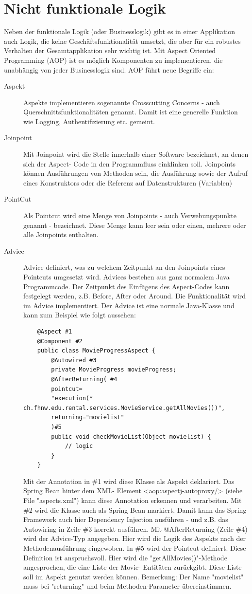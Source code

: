 \documentclass[a4paper,10pt]{scrreprt}
\begin{document}
\section{Nicht funktionale Logik}
Neben der funktionale Logik (oder Businesslogik) gibt es in einer Applikation auch Logik, die keine
Geschäftsfunktionalität umsetzt, die aber für ein robustes Verhalten der Gesamtapplikation sehr
wichtig ist. Mit Aspect Oriented Programming (AOP) ist es möglich Komponenten zu
implementieren, die unabhängig von jeder Businesslogik sind.
AOP führt neue Begriffe ein:
\begin{description}
 \item [Aspekt] Aspekte implementieren sogenannte Crosscutting Concerns - auch
Querschnittsfunktionalitäten genannt. Damit ist eine generelle Funktion wie Logging,
Authentifizierung etc. gemeint.
\item[Joinpoint] Mit Joinpoint wird die Stelle innerhalb einer Software bezeichnet, an denen sich der Aspect-
Code in den Programmfluss einklinken soll. Joinpoints können Ausführungen von Methoden
sein, die Ausführung sowie der Aufruf eines Konstruktors oder die Referenz auf
Datenstrukturen (Variablen)
\item[PointCut] Als Pointcut wird eine Menge von Joinpoints - auch Verwebungspunkte genannt - bezeichnet.
Diese Menge kann leer sein oder einen, mehrere oder alle Joinpoints enthalten. 
\item[Advice] Advice definiert, was zu welchem Zeitpunkt an den Joinpoints eines Pointcuts umgesetzt wird.
Advices bestehen aus ganz normalem Java Programmcode. Der Zeitpunkt des Einfügens des
Aspect-Codes kann festgelegt werden, z.B. Before, After oder Around.
Die Funktionalität wird im Advice implementiert. Der Advice ist eine normale Java-Klasse und kann
zum Beispiel wie folgt aussehen:
\begin{lstlisting}
	@Aspect #1
	@Component #2
	public class MovieProgressAspect {
		@Autowired #3
		private MovieProgress movieProgress;
		@AfterReturning( #4
		pointcut=
		"execution(* ch.fhnw.edu.rental.services.MovieService.getAllMovies())",
		returning="movielist"
		)#5
		public void checkMovieList(Object movielist) {
			// logic
		}
	}
\end{lstlisting}
Mit der Annotation in \#1 wird diese Klasse als Aspekt deklariert. Das Spring Bean hinter dem XML-
Element <aop:aspectj-autoproxy/> (siehe File "aspects.xml") kann diese Annotation erkennen und
verarbeiten. Mit \#2 wird die Klasse auch als Spring Bean markiert. Damit kann das Spring
Framework auch hier Dependency Injection ausführen - und z.B. das Autowiring in Zeile \#3 korrekt
ausführen.
Mit @AfterReturning (Zeile \#4) wird der Advice-Typ angegeben. Hier wird die Logik des Aspekts
nach der Methodenausführung eingewoben. In \#5 wird der Pointcut definiert. Diese Definition ist
anspruchsvoll. Hier wird die "getAllMovies()"-Methode angesprochen, die eine Liste der Movie-
Entitäten zurückgibt. Diese Liste soll im Aspekt genutzt werden können.
Bemerkung: Der Name "movielist" muss bei "returning" und beim Methoden-Parameter
übereinstimmen.
\end{description}
\end{document}
